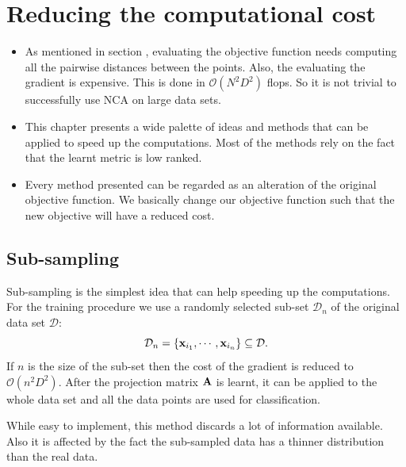 \chapter{Reducing the computational cost}
\label{ch:reducing}

\begin{itemize}
	\item As mentioned in section , evaluating the objective function needs computing all the pairwise distances between the points. Also, the evaluating the gradient is expensive. This is done in $\mathcal{O}(N^2D^2)$ flops. So it is not trivial to successfully use NCA on large data sets.
	\item This chapter presents a wide palette of ideas and methods that can be applied to speed up the computations. Most of the methods rely on the fact that the learnt metric is low ranked.
	\item Every method presented can be regarded as an alteration of the original objective function. We basically change our objective function such that the new objective will have a reduced cost.
\end{itemize}

\section{Sub-sampling}
\label{sec:sub-sampling}

Sub-sampling is the simplest idea that can help speeding up the computations. For the training procedure we use a randomly selected sub-set $\mathcal{D}_n$ of the original data set $\mathcal{D}$:
 \[
 	\mathcal{D}_n = \{ \mathbf{x}_{i_1},\cdots,\mathbf{x}_{i_n} \} \subseteq \mathcal{D}.
 \]
 If $n$ is the size of the sub-set then the cost of the gradient is reduced to $\mathcal{O}(n^2D^2)$. After the projection matrix $\mathbf{A}$ is learnt, it can be applied to the whole data set and all the data points are used for classification.

While easy to implement, this method discards a lot of information available. Also it is affected by the fact the sub-sampled data has a thinner distribution than the real data. 

